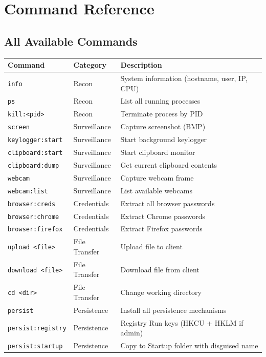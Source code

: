 \documentclass[12pt,a4paper]{article}
\begin{document}
\newpage
\section{Command Reference}

\subsection{All Available Commands}

\begin{longtable}{llp{5cm}}
\toprule
\textbf{Command} & \textbf{Category} & \textbf{Description} \\
\midrule
\endhead
\texttt{info} & Recon & System information (hostname, user, IP, CPU) \\
\texttt{ps} & Recon & List all running processes \\
\texttt{kill:<pid>} & Recon & Terminate process by PID \\
\midrule
\texttt{screen} & Surveillance & Capture screenshot (BMP) \\
\texttt{keylogger:start} & Surveillance & Start background keylogger \\
\texttt{clipboard:start} & Surveillance & Start clipboard monitor \\
\texttt{clipboard:dump} & Surveillance & Get current clipboard contents \\
\texttt{webcam} & Surveillance & Capture webcam frame \\
\texttt{webcam:list} & Surveillance & List available webcams \\
\midrule
\texttt{browser:creds} & Credentials & Extract all browser passwords \\
\texttt{browser:chrome} & Credentials & Extract Chrome passwords \\
\texttt{browser:firefox} & Credentials & Extract Firefox passwords \\
\midrule
\texttt{upload <file>} & File Transfer & Upload file to client \\
\texttt{download <file>} & File Transfer & Download file from client \\
\texttt{cd <dir>} & File Transfer & Change working directory \\
\midrule
\texttt{persist} & Persistence & Install all persistence mechanisms \\
\texttt{persist:registry} & Persistence & Registry Run keys (HKCU + HKLM if admin) \\
\texttt{persist:startup} & Persistence & Copy to Startup folder with disguised name \\

\end{longtable}
\end{document}
